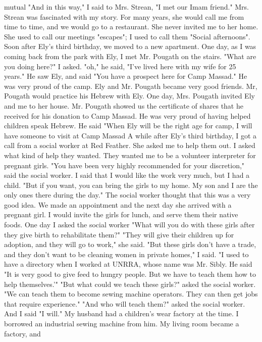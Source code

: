 mutual 
"And in this way," I said to Mrs. Strean, "I met our Imam friend." 
Mrs. Strean was fascinated with my story. For many years, she would call 
me from time to time, and we would go to a restaurant. She never invited me to her home. She used to call our meetings "escapes"; I used to 
call them "Social afternoons". 
Soon after Ely's third birthday, we moved to a new apartment. One 
day, as I was coming back from the park with Ely, I met Mr. Pougath on 
the stairs. 
"What are you doing here?" I asked. 
"oh," he said, "I've lived here with my wife for 25 years." He saw 
Ely, and said "You have a prospect here for Camp Massad." He was very 
proud of the camp. 
Ely and Mr. Pougath became very good friends. Mr, Pougath would practice his Hebrew with Ely. One day, Mrs. Pougath invited Ely and me to 
her house. Mr. Pougath showed us the certificate of shares that he received for his donation to Camp Massad. He was very proud of having helped children speak Hebrew. He said "When Ely will be the right age for 
camp, I will have someone to visit at Camp Massad 
A while after Ely's third birthday, I got a call from a social worker at Red Feather. She asked me to help them out. I asked what kind of 
help they wanted. They wanted me to be a volunteer interpreter for pregnant girls. 
"You have been very highly recommended for your discretion," said 
the social worker. 
I said that I would like the work very much, but I had a child. "But 
if you want, you can bring the girls to my home. My son and I are the 
only ones there during the day." 
The social worker thought that this was a very good idea. We made an appointment and the next day she arrived with a pregnant girl. I 
would invite the girls for lunch, and serve them their native foods. One
day I asked the social worker "What will you do with these girls after 
they give birth to rehabilitate them?" 
"They will give their children up for adoption, and they will go to 
work," she said. 
"But these girls don't have a trade, and they don't want to be cleaning women in private homes," I said. "I used to have a directory when I 
worked at UNRRA, whose name was Mr. Sibly. He said "It is very good to 
give feed to hungry people. But we have to teach them how to help themselves.'" 
"But what could we teach these girls?" asked the social worker. 
"We can teach them to become sewing machine operators. They can then get jobs that require experience." 
"And who will teach them?" asked the social worker. 
And I said "I will." 
My husband had a children's wear factory at the time. I borrowed an 
industrial sewing machine from him. My living room became a factory, and 
